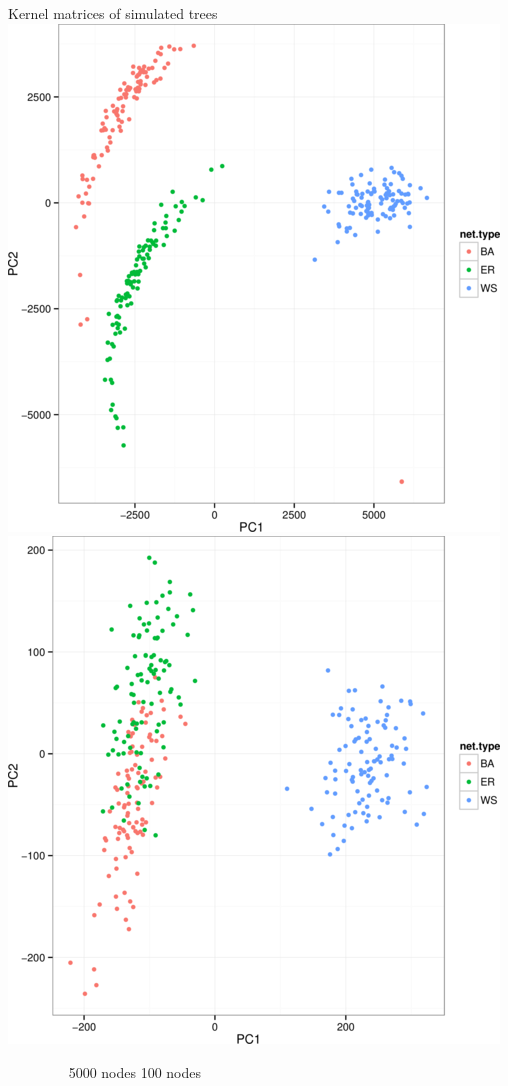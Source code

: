 \documentclass{beamer}
\begin{document}
\begin{frame}{Kernel matrices of simulated trees}
    \includegraphics[scale=0.3]{kmat5k}
    \includegraphics[scale=0.3]{kmat100}

    $\qquad$$\qquad$ 5000 nodes \hfill 100 nodes $\qquad$$\qquad$$\quad$
\end{frame}
\end{document}
